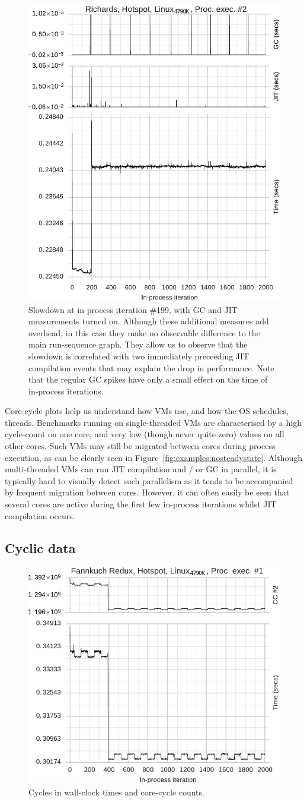 \documentclass[preprint,numbers,10pt]{sigplanconf}
\begin{document}
\begin{figure}[t]
\centering
\includegraphics[width=.45\textwidth]{examples/new_miscomp.pdf}
\caption{Slowdown at in-process iteration \#199, with GC and JIT measurements
turned on. Although these additional measures add overhead, in this
case they make no observable difference to the main run-sequence graph. They
allow us to observe that the slowdown is correlated with two immediately preceeding JIT compilation events
that may explain the drop in performance. Note that the
regular GC spikes have only a small effect on the time of in-process
iterations.}
\label{fig:examples:slowdown1}
\end{figure}

Core-cycle plots help us understand how VMs use, and how the OS schedules,
threads. Benchmarks running on single-threaded VMs are characterised by a high
cycle-count on one core, and very low (though never quite zero) values on all
other cores. Such VMs may still be migrated between cores during process
execution, as can be clearly seen in Figure~\ref{fig:examples:nosteadystate}.
Although multi-threaded VMs can run JIT compilation and / or GC in parallel,
it is typically hard to visually detect such parallelism as it tends to be
accompanied by frequent migration between cores.
However, it can often easily be seen that several cores are active during the first few
in-process iterations whilst JIT compilation occurs.


\subsection{Cyclic data}

\begin{figure}[tbp]
\centering
\includegraphics[width=.45\textwidth]{examples/new_cyclic.pdf}
\caption{Cycles in wall-clock times and core-cycle counts.}
\label{fig:examples:cycles}
\end{figure}
\end{document}
